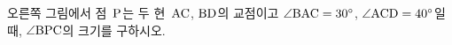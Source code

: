 \noindent\begin{minipage}[t]{0.58\linewidth}\vspace{0pt}\raggedright 오른쪽 그림에서 점~$\mathrm{P}$는 두 현~$\mathrm{AC}$, $\mathrm{BD}$의 교점이고 $\angle\mathrm{BAC}=30^\circ$, $\angle\mathrm{ACD}=40^\circ$일 때, $\angle\mathrm{BPC}$의 크기를 구하시오.\end{minipage}\hfill\begin{minipage}[t]{0.4\linewidth}\vspace{0pt}\centering \resizebox{\ifdim\width>\linewidth\linewidth\else\width\fi}{!}{}\end{minipage}\par
